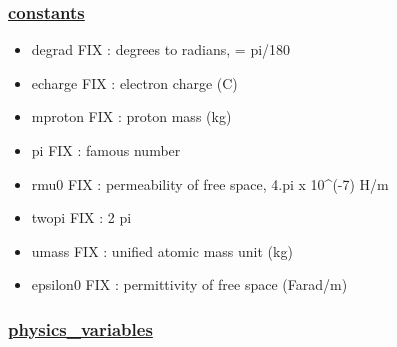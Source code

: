 \documentclass[]{article}
\providecommand{\tightlist}{%
  \setlength{\itemsep}{0pt}\setlength{\parskip}{0pt}}
\begin{document}
\hypertarget{constants}{%
\subsubsection{\texorpdfstring{\href{constants.html}{constants}}{constants}}\label{constants}}

\begin{itemize}
\tightlist
\item
  degrad FIX : degrees to radians, = pi/180
\item
  echarge FIX : electron charge (C)
\item
  mproton FIX : proton mass (kg)
\item
  pi FIX : famous number
\item
  rmu0 FIX : permeability of free space, 4.pi x 10\^{}(-7) H/m
\item
  twopi FIX : 2 pi
\item
  umass FIX : unified atomic mass unit (kg)
\item
  epsilon0 FIX : permittivity of free space (Farad/m)
\end{itemize}

\hypertarget{physics_variables}{%
\subsubsection{\texorpdfstring{\href{physics_variables.html}{physics\_variables}}{physics\_variables}}\label{physics_variables}}
\end{document}
